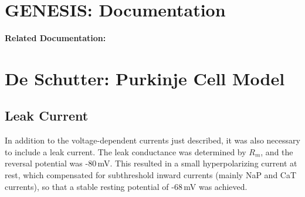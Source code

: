 \documentclass[12pt]{article}
\begin{document}
\section*{GENESIS: Documentation}

{\bf Related Documentation:}

\section*{De Schutter: Purkinje Cell Model}

\subsection*{Leak Current}

In addition to the voltage-dependent currents just described,
it was also necessary to include a leak current. The
leak conductance was determined by $R_m$, and the reversal potential
was -80\,mV. This resulted in a small hyperpolarizing current at
rest, which compensated for subthreshold inward currents
(mainly NaP and CaT currents), so that a stable resting potential
of -68\,mV was achieved.



\end{document}
